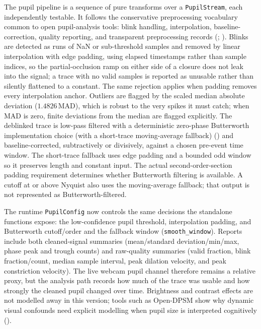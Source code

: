 \documentclass[
]{article}
\begin{document}
The pupil pipeline is a sequence of pure transforms over a
\texttt{PupilStream}, each independently testable. It follows the
conservative preprocessing vocabulary common to open pupil-analysis
tools: blink handling, interpolation, baseline-correction, quality
reporting, and transparent preprocessing records
(;
). Blinks are
detected as runs of NaN or sub-threshold samples and removed by linear
interpolation with edge padding, using elapsed timestamps rather than
sample indices, so the partial-occlusion ramp on either side of a
closure does not leak into the signal; a trace with no valid samples is
reported as unusable rather than silently flattened to a constant. The
same rejection applies when padding removes every interpolation anchor.
Outliers are flagged by the scaled median absolute deviation
(\(1.4826\,\mathrm{MAD}\)), which is robust to the very spikes it must
catch; when MAD is zero, finite deviations from the median are flagged
explicitly. The deblinked trace is low-pass filtered with a
deterministic zero-phase Butterworth implementation choice (with a
short-trace moving-average fallback)
() and
baseline-corrected, subtractively or divisively, against a chosen
pre-event time window. The short-trace fallback uses edge padding and a
bounded odd window so it preserves length and constant input. The actual
second-order-section padding requirement determines whether Butterworth
filtering is available. A cutoff at or above Nyquist also uses the
moving-average fallback; that output is not represented as
Butterworth-filtered.

The runtime \texttt{PupilConfig} now controls the same decisions the
standalone functions expose: the low-confidence pupil threshold,
interpolation padding, and Butterworth cutoff/order and the fallback
window (\texttt{smooth\_window}). Reports include both cleaned-signal
summaries (mean/standard deviation/min/max, phase peak and trough
counts) and raw-quality summaries (valid fraction, blink fraction/count,
median sample interval, peak dilation velocity, and peak constriction
velocity). The live webcam pupil channel therefore remains a relative
proxy, but the analysis path records how much of the trace was usable
and how strongly the cleaned pupil changed over time. Brightness and
contrast effects are not modelled away in this version; tools such as
Open-DPSM show why dynamic visual confounds need explicit modelling when
pupil size is interpreted cognitively
().
\end{document}
